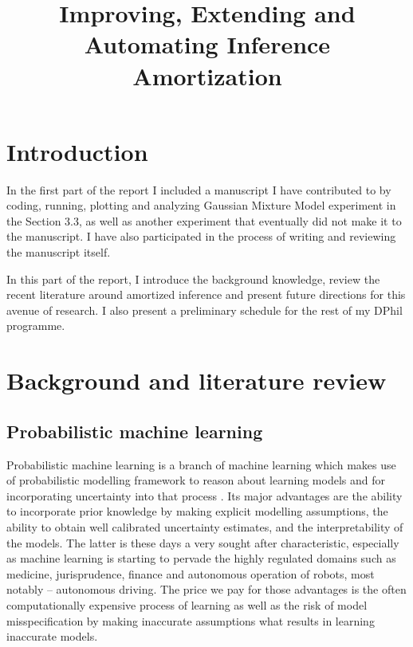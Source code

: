 \documentclass[12pt]{article}
\begin{document}




\title{Improving, Extending and Automating Inference Amortization}
\date{}
\maketitle

\vspace{-50pt}

\section{Introduction}

In the first part of the report I included a manuscript I have contributed to by coding, running, plotting and analyzing Gaussian Mixture Model experiment in the Section 3.3, as well as another experiment that eventually did not make it to the manuscript. 
I have also participated in the process of writing and reviewing the manuscript itself.

In this part of the report, I introduce the background knowledge, review the recent literature around amortized inference and present future directions for this avenue of research. 
I also present a preliminary schedule for the rest of my DPhil programme.






\section{Background and literature review}

\subsection{Probabilistic machine learning}
Probabilistic machine learning is a branch of machine learning which makes use of probabilistic modelling framework to reason about learning models and for incorporating uncertainty into that process \citep{Ghahramani2015}.
Its major advantages are the ability to incorporate prior knowledge by making explicit modelling assumptions, the ability to obtain well calibrated uncertainty estimates, and the interpretability of the models.
The latter is these days a very sought after characteristic, especially as machine learning is starting to pervade the highly regulated domains such as medicine, jurisprudence, finance and autonomous operation of robots, most notably -- autonomous driving.
The price we pay for those advantages is the often computationally expensive process of learning as well as the risk of model misspecification by making inaccurate assumptions what results in learning inaccurate models.
\end{document}
